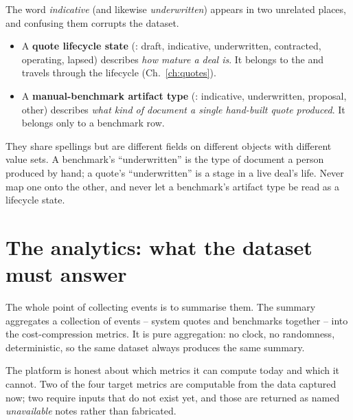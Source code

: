 \begin{caution}
The word \emph{indicative} (and likewise \emph{underwritten}) appears in two unrelated places, and confusing them corrupts the dataset.
\begin{itemize}
  \item A \textbf{quote lifecycle state} (: draft, indicative, underwritten, contracted, operating, lapsed) describes \emph{how mature a deal is}. It belongs to the  and travels through the lifecycle (Ch.~\ref{ch:quotes}).
  \item A \textbf{manual-benchmark artifact type} (: indicative, underwritten, proposal, other) describes \emph{what kind of document a single hand-built quote produced}. It belongs only to a benchmark row.
\end{itemize}
They share spellings but are different fields on different objects with different value sets. A benchmark's ``underwritten'' is the type of document a person produced by hand; a quote's ``underwritten'' is a stage in a live deal's life. Never map one onto the other, and never let a benchmark's artifact type be read as a lifecycle state.
\end{caution}

\section{The analytics: what the dataset must answer}

The whole point of collecting events is to summarise them. The summary aggregates a collection of events -- system quotes and benchmarks together -- into the cost-compression metrics. It is pure aggregation: no clock, no randomness, deterministic, so the same dataset always produces the same summary.

The platform is honest about which metrics it can compute today and which it cannot. Two of the four target metrics are computable from the data captured now; two require inputs that do not exist yet, and those are returned as named \emph{unavailable} notes rather than fabricated.

